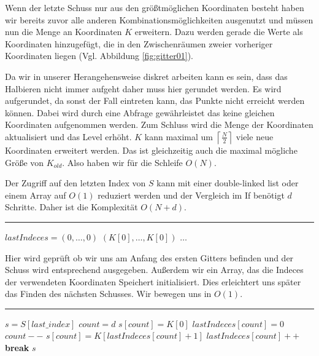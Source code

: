 \documentclass[a4paper,12pt]{llncs}
\numberwithin{equation}{section}
\begin{document}
Wenn der letzte Schuss nur aus den größtmöglichen Koordinaten besteht haben wir bereits zuvor alle anderen Kombinationsmöglichkeiten ausgenutzt und müssen nun die Menge an Koordinaten $K$ erweitern. Dazu werden gerade die Werte als Koordinaten hinzugefügt, die in den Zwischenräumen zweier vorheriger Koordinaten liegen (Vgl. Abbildung \ref{fig:gitter01}). 

Da wir in unserer Herangehensweise diskret arbeiten kann es sein, dass das Halbieren nicht immer aufgeht daher muss hier gerundet werden. Es wird aufgerundet, da sonst der Fall eintreten kann, das Punkte nicht erreicht werden können. Dabei wird durch eine Abfrage gewährleistet das keine gleichen Koordinaten aufgenommen werden. Zum Schluss wird die Menge der Koordinaten aktualisiert und das Level erhöht. $K$ kann maximal um $\left\lceil\frac{N}{2}\right\rceil$ viele neue Koordinaten erweitert werden. Das ist gleichzeitig auch die maximal mögliche Größe von $K_{old}$. Also haben wir für die Schleife $O(N)$. 


Der Zugriff auf den letzten Index von $S$ kann mit einer double-linked list oder einem Array auf $O(1)$ reduziert werden und der Vergleich im If benötigt $d$ Schritte. Daher ist die Komplexität $O\left(N+d\right)$.

\smallskip
\hrule
\smallskip

\begin{tcolorbox}
	\begin{algorithmic}
		\State $lastIndeces = (0,\dots,0)$
		\State \Return $(K[0],\dots,K[0])$
		\Else
		\State $\dots$
		\EndIf
	\end{algorithmic}
\end{tcolorbox}

Hier wird geprüft ob wir uns am Anfang des ersten Gitters befinden und der Schuss wird entsprechend ausgegeben. Außerdem wir ein Array, das die Indeces der verwendeten Koordinaten Speichert initialisiert. Dies erleichtert uns später das Finden des nächsten Schusses. Wir bewegen uns in $O(1)$.

\smallskip
\hrule
\smallskip

\begin{tcolorbox}
	\begin{algorithmic}
		\Function{increment\_Coordinates}{}
		\State $s=S[last\_index]$
		\State $count =d$
		\While{True}
		\If{$s[count]=max\_coord$}
		\State $s[count]=K[0]$
		\State $lastIndeces[count]=0$
		\State $count--$
		\Else
		\State $s[count] = K[lastIndeces[count]+1]$
		\State $lastIndeces[count]++$
		\State\textbf{break}
		\State\Return $s$
		\EndIf
		\EndWhile
		\EndFunction
	\end{algorithmic}
\end{tcolorbox}
\end{document}
